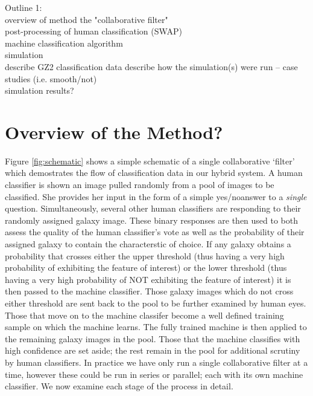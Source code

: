\documentclass[twocolumn]{aastex6}
\begin{document}
 Outline 1: \\
overview of method 
\indent the "collaborative filter" \\
\indent  post-processing of human classification (SWAP) \\
\indent machine classification algorithm \\
simulation \\
\indent describe GZ2 classification data
\indent describe  how the simulation(s) were run -- case studies (i.e. smooth/not) \\
\indent simulation results? \\


\section{Overview of the Method?}
Figure \ref{fig:schematic} shows a simple schematic of a single collaborative `filter' which demostrates the flow of classification data in our hybrid system.  A human classifier is shown an image pulled randomly from a pool of images to be classified. She provides her input in the form of a simple yes/noanswer to a \textit{single} question. Simultaneously, several other human classifiers are responding to their randomly assigned galaxy image. These binary responses are then used to both assess the quality of the human classifier's vote as well as the probability of their assigned galaxy to contain the characterstic of choice. If any galaxy obtains a probability that crosses either the upper threshold (thus having a very high probability of exhibiting the feature of interest) or the lower threshold (thus having a very high probability of NOT exhibiting the feature of interest) it is then passed to the machine classifier. Those galaxy images which do not cross either threshold are sent back to the pool to be further examined by human eyes. Those that move on to the machine classifer become a well defined training sample on which the machine learns. The fully trained machine is then applied to the remaining galaxy images in the  pool. Those that the machine classifies with high confidence are set aside; the rest remain in the pool for additional scrutiny by human classifiers.  In practice we have only run a single collaborative filter at a time, however these could be run in series or parallel; each with its own machine classifier. We now examine each stage of the process in detail. 

\begin{figure*}[ht!]
\caption{Schematic of our hybrid system. Human classifiers are shown images of galaxies via the Galaxy Zoo web interface. These  classifications are recorded and processed according to section XXX. As a result of the processing, those subjects whose probabilties cross the classification thresholds are passed to the machine classifier as a training sample. The trained machine is then applied to the remaining subjects in the database (test sample). Those subjects which the machine classifies with high confidence are removed from the sample and considered fully classified. The rest remain in the database to be seen by human classifiers. \label{fig:schematic}}
\end{figure*}
\end{document}
